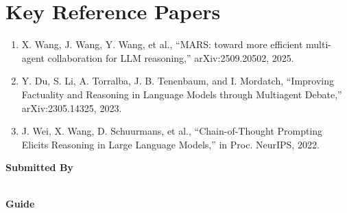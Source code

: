 \documentclass[11pt]{article}
\begin{document}
\section*{Key Reference Papers}
\begin{enumerate}
  \item X. Wang, J. Wang, Y. Wang, et al., ``MARS: toward more efficient multi-agent collaboration for LLM reasoning,'' arXiv:2509.20502, 2025.
  \item Y. Du, S. Li, A. Torralba, J. B. Tenenbaum, and I. Mordatch, ``Improving Factuality and Reasoning in Language Models through Multiagent Debate,'' arXiv:2305.14325, 2023.
  \item J. Wei, X. Wang, D. Schuurmans, et al., ``Chain-of-Thought Prompting Elicits Reasoning in Large Language Models,'' in Proc. NeurIPS, 2022.
\end{enumerate}
\vspace{0.8em}
\noindent\textbf{Submitted By}\\
\seminarName\\
\seminarRoll

\vspace{0.6em}
\noindent\textbf{Guide}\\
\seminarGuide
\end{document}
